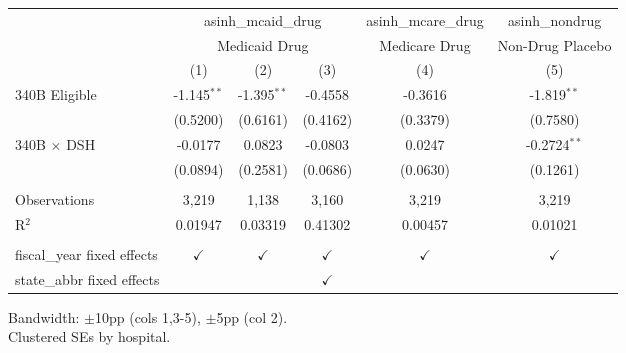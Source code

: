 \begingroup
\centering
\begin{tabular}{lccccc}
   \toprule
    & \multicolumn{3}{c}{asinh\_mcaid\_drug} & asinh\_mcare\_drug & asinh\_nondrug\\
    & \multicolumn{3}{c}{Medicaid Drug} & Medicare Drug & Non-Drug Placebo \\ 
                               & (1)           & (2)           & (3)           & (4)           & (5)\\  
   \midrule 
   340B Eligible               & -1.145$^{**}$ & -1.395$^{**}$ & -0.4558       & -0.3616       & -1.819$^{**}$\\   
                               & (0.5200)      & (0.6161)      & (0.4162)      & (0.3379)      & (0.7580)\\   
   340B $\times$ DSH           & -0.0177       & 0.0823        & -0.0803       & 0.0247        & -0.2724$^{**}$\\   
                               & (0.0894)      & (0.2581)      & (0.0686)      & (0.0630)      & (0.1261)\\   
    \\
   Observations                & 3,219         & 1,138         & 3,160         & 3,219         & 3,219\\  
   R$^2$                       & 0.01947       & 0.03319       & 0.41302       & 0.00457       & 0.01021\\  
    \\
   fiscal\_year fixed effects  & $\checkmark$  & $\checkmark$  & $\checkmark$  & $\checkmark$  & $\checkmark$\\   
   state\_abbr fixed effects   &               &               & $\checkmark$  &               & \\  
   \bottomrule
\end{tabular}
 
\par \raggedright 
Bandwidth: $\pm$10pp (cols 1,3-5), $\pm$5pp (col 2).\\
Clustered SEs by hospital.
\par\endgroup
